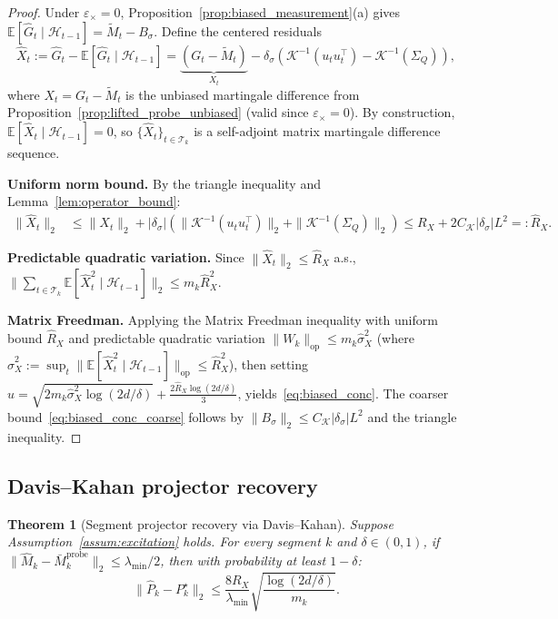 \documentclass[12pt]{article}
\newcommand{\E}{\mathbb{E}}
\newcommand{\op}{\mathrm{op}}
\newcommand{\cH}{\mathcal{H}}
\newcommand{\cT}{\mathcal{T}}
\newtheorem{theorem}{Theorem}
\theoremstyle{plain}
\theoremstyle{definition}
\begin{document}
\begin{proof}
Under $\varepsilon_\times = 0$, Proposition~\ref{prop:biased_measurement}(a) gives $\E[\hat{G}_t \mid \cH_{t-1}] = \widetilde{M}_t - B_\sigma$. Define the centered residuals
\[
\hat{X}_t := \hat{G}_t - \E[\hat{G}_t \mid \cH_{t-1}]
= \underbrace{(G_t - \widetilde{M}_t)}_{X_t}
- \delta_\sigma\!\left(\mathcal{K}^{-1}(u_t u_t^\top) - \mathcal{K}^{-1}(\Sigma_Q)\right),
\]
where $X_t = G_t - \widetilde{M}_t$ is the unbiased martingale difference from Proposition~\ref{prop:lifted_probe_unbiased} (valid since $\varepsilon_\times = 0$). By construction, $\E[\hat{X}_t \mid \cH_{t-1}] = 0$, so $\{\hat{X}_t\}_{t \in \cT_k}$ is a self-adjoint matrix martingale difference sequence.

\textbf{Uniform norm bound.} By the triangle inequality and Lemma~\ref{lem:operator_bound}:
\begin{align*}
\|\hat{X}_t\|_2
&\le \|X_t\|_2 + |\delta_\sigma|\!\left(\|\mathcal{K}^{-1}(u_t u_t^\top)\|_2 + \|\mathcal{K}^{-1}(\Sigma_Q)\|_2\right)
\le R_X + 2C_{\mathcal{K}} |\delta_\sigma| L^2 =: \hat{R}_X.
\end{align*}

\textbf{Predictable quadratic variation.} Since $\|\hat{X}_t\|_2 \le \hat{R}_X$ a.s., $\|\sum_{t \in \cT_k} \E[\hat{X}_t^2 \mid \cH_{t-1}]\|_2 \le m_k \hat{R}_X^2$.

\textbf{Matrix Freedman.} Applying the Matrix Freedman inequality \citep[Theorem~1.6]{tropp2012user} with uniform bound $\hat{R}_X$ and predictable quadratic variation $\|W_k\|_{\op} \le m_k \hat\sigma_X^2$ (where $\hat\sigma_X^2 := \sup_t \|\E[\hat{X}_t^2 \mid \cH_{t-1}]\|_{\op} \le \hat{R}_X^2$), then setting $u = \sqrt{2m_k \hat\sigma_X^2 \log(2d/\delta)} + \frac{2\hat{R}_X\log(2d/\delta)}{3}$, yields~\eqref{eq:biased_conc}. The coarser bound~\eqref{eq:biased_conc_coarse} follows by $\|B_\sigma\|_2 \le C_{\mathcal{K}} |\delta_\sigma| L^2$ and the triangle inequality.
\end{proof}

\subsection{Davis--Kahan projector recovery}

\begin{theorem}[Segment projector recovery via Davis--Kahan]
\label{thm:davis_kahan}
Suppose Assumption~\ref{assum:excitation} holds. For every segment $k$ and $\delta \in (0,1)$, if $\|\widehat{M}_k - \bar{M}_k^{\mathrm{probe}}\|_2 \le \lambda_{\min}/2$, then with probability at least $1 - \delta$:
\[
\|\widehat{P}_k - P_k^\star\|_2 \le \frac{8R_X}{\lambda_{\min}} \sqrt{\frac{\log(2d/\delta)}{m_k}}.
\]
\end{theorem}
\end{document}
